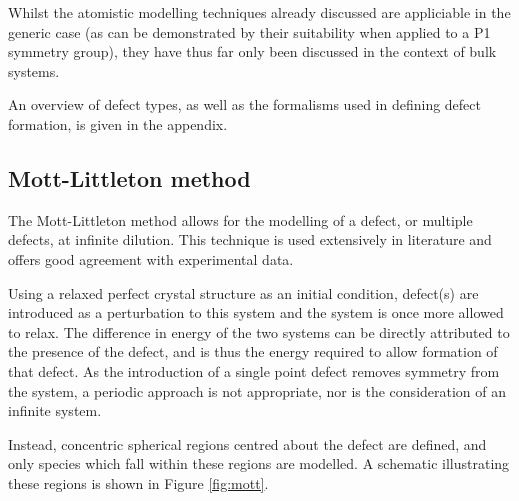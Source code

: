 Whilst the atomistic modelling techniques already discussed are appliciable in the generic case (as can be demonstrated by their suitability when applied to a P1 symmetry group), they have thus far only been discussed in the context of bulk systems.

An overview of defect types, as well as the formalisms used in defining defect formation, is given in the appendix.

\subsection{Mott-Littleton method}
The Mott-Littleton method allows for the modelling of a defect, or multiple defects, at infinite dilution.
This technique is used extensively in literature\cite{Fisher2008} and offers good agreement with experimental data.

Using a relaxed perfect crystal structure as an initial condition, defect(s) are introduced as a perturbation to this system and the system is once more allowed to relax.
The difference in energy of the two systems can be directly attributed to the presence of the defect, and is thus the energy required to allow formation of that defect.
As the introduction of a single point defect removes symmetry from the system, a periodic approach is not appropriate, nor is the consideration of an infinite system.

Instead, concentric spherical regions centred about the defect are defined, and only species which fall within these regions are modelled.
A schematic illustrating these regions is shown in Figure \ref{fig:mott}. 

